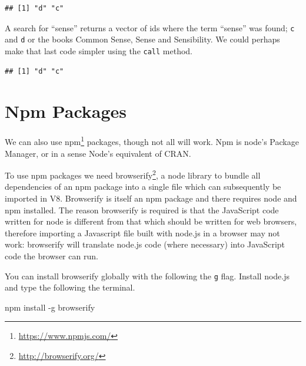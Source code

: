 \documentclass[
]{krantz}
\makeatletter
\newenvironment{Shaded}{\begin{snugshade}}{\end{snugshade}}
\newcommand{\ExtensionTok}[1]{#1}
\newcommand{\KeywordTok}[1]{\textcolor[rgb]{0.27,0.27,0.27}{\textbf{#1}}}
\newcommand{\NormalTok}[1]{#1}
\newcommand{\OperatorTok}[1]{\textcolor[rgb]{0.43,0.43,0.43}{\textbf{#1}}}
\newcommand{\StringTok}[1]{\textcolor[rgb]{0.5,0.5,0.5}{#1}}
\renewcommand{\href}[2]{#2\footnote{\url{#1}}}
\newenvironment{kframe}{%
\medskip{}
\setlength{\fboxsep}{.8em}
 \def\at@end@of@kframe{}%
 \ifinner\ifhmode%
  \def\at@end@of@kframe{\end{minipage}}%
  \begin{minipage}{\columnwidth}%
 \fi\fi%
 \def\FrameCommand##1{\hskip\@totalleftmargin \hskip-\fboxsep
 \colorbox{shadecolor}{##1}\hskip-\fboxsep
     \hskip-\linewidth \hskip-\@totalleftmargin \hskip\columnwidth}%
 \MakeFramed {\advance\hsize-\width
   \@totalleftmargin\z@ \linewidth\hsize
   \@setminipage}}%
 {\par\unskip\endMakeFramed%
 \at@end@of@kframe}
\renewenvironment{Shaded}{\begin{kframe}}{\end{kframe}}
\makeatother
\begin{document}
\begin{verbatim}
## [1] "d" "c"
\end{verbatim}

A search for ``sense'' returns a vector of ids where the term ``sense'' was found; \texttt{c} and \texttt{d} or the books Common Sense, Sense and Sensibility. We could perhaps make that last code simpler using the \texttt{call} method.

\begin{Shaded}
\end{Shaded}

\begin{verbatim}
## [1] "d" "c"
\end{verbatim}

\hypertarget{v8-npm}{%
\section{Npm Packages}\label{v8-npm}}

We can also use \href{https://www.npmjs.com/}{npm} packages, though not all will work. Npm is node's Package Manager, or in a sense Node's equivalent of CRAN.

To use npm packages we need \href{http://browserify.org/}{browserify}, a node library to bundle all dependencies of an npm package into a single file which can subsequently be imported in V8. Browserify is itself an npm package and there requires node and npm installed. The reason browserify is required is that the JavaScript code written for node is different from that which should be written for web browsers, therefore importing a Javascript file built with node.js in a browser may not work: browserify will translate node.js code (where necessary) into JavaScript code the browser can run.

You can install browserify globally with the following the \texttt{g} flag. Install node.js and type the following the terminal.

\begin{Shaded}
\begin{Highlighting}[]
\ExtensionTok{npm}\NormalTok{ install {-}g browserify}
\end{Highlighting}
\end{Shaded}
\end{document}
